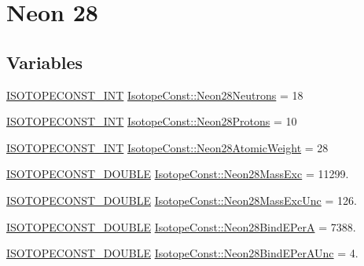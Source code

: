 \hypertarget{group___isotope_const-_neon-_ne28}{}\section{Neon 28}
\label{group___isotope_const-_neon-_ne28}
\subsection*{Variables}
\begin{DoxyCompactItemize}
\item 
\mbox{\hyperlink{group___isotope_const-_macros_ga5f18360b3e99483a35c32d789e62621c}{I\+S\+O\+T\+O\+P\+E\+C\+O\+N\+S\+T\+\_\+\+I\+NT}} \mbox{\hyperlink{group___isotope_const-_neon-_ne28_ga9d9d50c33b4aada6b3842041a8db440f}{Isotope\+Const\+::\+Neon28\+Neutrons}} = 18
\item 
\mbox{\hyperlink{group___isotope_const-_macros_ga5f18360b3e99483a35c32d789e62621c}{I\+S\+O\+T\+O\+P\+E\+C\+O\+N\+S\+T\+\_\+\+I\+NT}} \mbox{\hyperlink{group___isotope_const-_neon-_ne28_gad228b1fc55dd5954989e33fa5eea5e34}{Isotope\+Const\+::\+Neon28\+Protons}} = 10
\item 
\mbox{\hyperlink{group___isotope_const-_macros_ga5f18360b3e99483a35c32d789e62621c}{I\+S\+O\+T\+O\+P\+E\+C\+O\+N\+S\+T\+\_\+\+I\+NT}} \mbox{\hyperlink{group___isotope_const-_neon-_ne28_gaad970d7aacebccf54f007c617857c7b3}{Isotope\+Const\+::\+Neon28\+Atomic\+Weight}} = 28
\item 
\mbox{\hyperlink{group___isotope_const-_macros_ga8f45a7272ce02c0b4c65c44636ed719a}{I\+S\+O\+T\+O\+P\+E\+C\+O\+N\+S\+T\+\_\+\+D\+O\+U\+B\+LE}} \mbox{\hyperlink{group___isotope_const-_neon-_ne28_gae48c7c877b91c389b2ee54119d49dc2e}{Isotope\+Const\+::\+Neon28\+Mass\+Exc}} = 11299.
\item 
\mbox{\hyperlink{group___isotope_const-_macros_ga8f45a7272ce02c0b4c65c44636ed719a}{I\+S\+O\+T\+O\+P\+E\+C\+O\+N\+S\+T\+\_\+\+D\+O\+U\+B\+LE}} \mbox{\hyperlink{group___isotope_const-_neon-_ne28_gae65736ca059f96155c298f38d6f43c48}{Isotope\+Const\+::\+Neon28\+Mass\+Exc\+Unc}} = 126.
\item 
\mbox{\hyperlink{group___isotope_const-_macros_ga8f45a7272ce02c0b4c65c44636ed719a}{I\+S\+O\+T\+O\+P\+E\+C\+O\+N\+S\+T\+\_\+\+D\+O\+U\+B\+LE}} \mbox{\hyperlink{group___isotope_const-_neon-_ne28_ga7e28fded1e84296d45d0d99a56a5345b}{Isotope\+Const\+::\+Neon28\+Bind\+E\+PerA}} = 7388.
\item 
\mbox{\hyperlink{group___isotope_const-_macros_ga8f45a7272ce02c0b4c65c44636ed719a}{I\+S\+O\+T\+O\+P\+E\+C\+O\+N\+S\+T\+\_\+\+D\+O\+U\+B\+LE}} \mbox{\hyperlink{group___isotope_const-_neon-_ne28_gac0edaf01ca73ef2cca6b67115d2481c7}{Isotope\+Const\+::\+Neon28\+Bind\+E\+Per\+A\+Unc}} = 4.

\end{DoxyCompactItemize}
